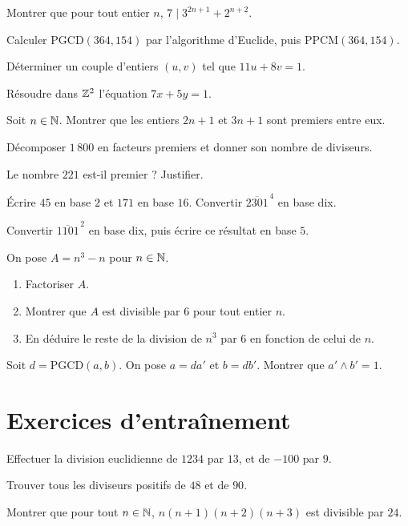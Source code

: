 \exo{} Montrer que pour tout entier $n$, $7\mid 3^{2n+1}+2^{n+2}$.

\exo{} Calculer $\mathrm{PGCD}(364,154)$ par l'algorithme d'Euclide, puis $\mathrm{PPCM}(364,154)$.

\exo{} Déterminer un couple d'entiers $(u,v)$ tel que $11u+8v=1$.

\exo{} Résoudre dans $\mathbb{Z}^2$ l'équation $7x+5y=1$.

\exo{} Soit $n\in\mathbb{N}$. Montrer que les entiers $2n+1$ et $3n+1$ sont premiers entre eux.

\exo{} Décomposer $1\,800$ en facteurs premiers et donner son nombre de diviseurs.

\exo{} Le nombre $221$ est-il premier ? Justifier.

\exo{} Écrire $45$ en base $2$ et $171$ en base $16$. Convertir $\overline{2301}^{\,4}$ en base dix.

\exo{} Convertir $\overline{1101}^{\,2}$ en base dix, puis écrire ce résultat en base $5$.

\exo{} On pose $A=n^{3}-n$ pour $n\in\mathbb{N}$.
\begin{enumerate}[label=\arabic*)]
\item Factoriser $A$.
\item Montrer que $A$ est divisible par $6$ pour tout entier $n$.
\item En déduire le reste de la division de $n^{3}$ par $6$ en fonction de celui de $n$.
\end{enumerate}

\exo{} Soit $d=\mathrm{PGCD}(a,b)$. On pose $a=d a'$ et $b=d b'$. Montrer que $a'\wedge b'=1$.

\section{Exercices d'entraînement}

\exo{} Effectuer la division euclidienne de $1234$ par $13$, et de $-100$ par $9$.

\exo{} Trouver tous les diviseurs positifs de $48$ et de $90$.

\exo{} Montrer que pour tout $n\in\mathbb{N}$, $n(n+1)(n+2)(n+3)$ est divisible par $24$.

